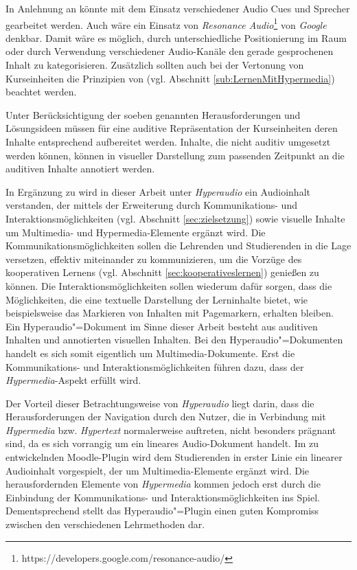 In Anlehnung an \cite{donker2007gestaltung} könnte mit dem Einsatz verschiedener Audio Cues und Sprecher gearbeitet werden. Auch wäre ein Einsatz von \textit{Resonance Audio}\footnote{https://developers.google.com/resonance-audio/} von \textit{Google} denkbar. Damit wäre es möglich, durch unterschiedliche Positionierung im Raum oder durch Verwendung verschiedener Audio-Kanäle den gerade gesprochenen Inhalt zu kategorisieren. Zusätzlich sollten auch bei der Vertonung von Kurseinheiten die Prinzipien von \cite{mayer2009multimedia} (vgl. Abschnitt \ref{sub:LernenMitHypermedia}) beachtet werden.

Unter Berücksichtigung der soeben genannten Herausforderungen und Lösungsideen müssen für eine auditive Repräsentation der Kurseinheiten deren Inhalte entsprechend aufbereitet werden. Inhalte, die nicht auditiv umgesetzt werden können, können in visueller Darstellung zum passenden Zeitpunkt an die auditiven Inhalte annotiert werden.

In Ergänzung zu \cite{zumbach2006learning} wird in dieser Arbeit unter \textit{Hyperaudio} ein Audioinhalt verstanden, der mittels der Erweiterung durch Kommunikations- und Interaktionsmöglichkeiten (vgl. Abschnitt \ref{sec:zielsetzung}) sowie visuelle Inhalte um Multimedia- und Hypermedia-Elemente ergänzt wird. Die Kommunikationsmöglichkeiten sollen die Lehrenden und Studierenden in die Lage versetzen, effektiv miteinander zu kommunizieren, um die Vorzüge des kooperativen Lernens (vgl. Abschnitt \ref{sec:kooperativeslernen}) genießen zu können. Die Interaktionsmöglichkeiten sollen wiederum dafür sorgen, dass die Möglichkeiten, die eine textuelle Darstellung der Lerninhalte bietet, wie beispielsweise das Markieren von Inhalten mit Pagemarkern, erhalten bleiben.\\
Ein Hyperaudio"=Dokument im Sinne dieser Arbeit besteht aus auditiven Inhalten und annotierten visuellen Inhalten. Bei den Hyperaudio"=Dokumenten handelt es sich somit eigentlich um Multimedia-Dokumente. Erst die Kommunikations- und Interaktionsmöglichkeiten führen dazu, dass der \textit{Hypermedia}-Aspekt erfüllt wird.

Der Vorteil dieser Betrachtungsweise von \textit{Hyperaudio} liegt darin, dass die Herausforderungen der Navigation durch den Nutzer, die in Verbindung mit \textit{Hypermedia} bzw. \textit{Hypertext} normalerweise auftreten, nicht besonders prägnant sind, da es sich vorrangig um ein lineares Audio-Dokument handelt. Im zu entwickelnden Moodle-Plugin wird dem Studierenden in erster Linie ein linearer Audioinhalt vorgespielt, der um Multimedia-Elemente ergänzt wird. Die herausfordernden Elemente von \textit{Hypermedia} kommen jedoch erst durch die Einbindung der Kommunikations- und Interaktionsmöglichkeiten ins Spiel. Dementsprechend stellt das Hyperaudio"=Plugin einen guten Kompromiss zwischen den verschiedenen Lehrmethoden dar.

